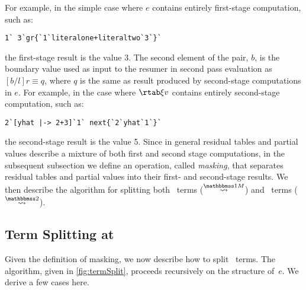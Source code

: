 \begin{abstrsyn}
For example, in the simple case where $e$
contains entirely first-stage computation, such as:
\begin{lstlisting}
1` 3`gr{`1`literalone+literaltwo`3`}`
\end{lstlisting}
the first-stage result is the value 3.  The second element of the pair, $b$,
is the boundary value used as input to the resumer in second pass
evaluation as $[b/l]r \equiv q$, where $q$ is the same as
result produced by second-stage computations in $e$.  For example, in
the case where $\rtab \xi v$ contains entirely second-stage
computation, such as:
\begin{lstlisting}
2`[yhat |-> 2+3]`1` next{`2`yhat`1`}`
\end{lstlisting}
the second-stage result is the value 5. Since in general residual
tables and partial values describe a mixture of both first and second
stage computations, in the subsequent subsection we define an
operation, called {\em masking}, that separates residual tables and
partial values into their first- and second-stage results. We then
describe the algorithm for splitting both \bbonem\ terms
($\splitonesym$) and \bbtwo\ terms ($\splittwosym$).






\subsection{Term Splitting at \bbonem}
\label{sec:split-one}

Given the definition of masking, we now describe how to split
\bbonem\ terms. The algorithm, given in \cref{fig:termSplit}, proceeds
recursively on the structure of~$e$. We derive a few cases here.


\end{abstrsyn}
